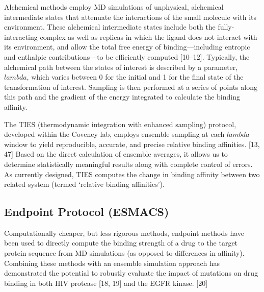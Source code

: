 \documentclass[conference]{IEEEtran}
\begin{document}
Alchemical methods employ MD simulations of unphysical, alchemical intermediate states that attenuate the interactions of the small molecule with its environment. These alchemical intermediate states include both the fully-interacting complex as well as replicas in which the ligand does not interact with its environment, and allow the total free energy of binding—including entropic and enthalpic contributions—to be efficiently computed [10–12]. Typically, the alchemical path between the states of interest is described by a parameter, $lambda$, which varies between 0 for the initial and 1 for the final state of the transformation of interest. Sampling is then performed at a series of points along this path and the gradient of the energy integrated to calculate the binding affinity.

The TIES (thermodynamic integration with enhanced sampling) protocol, developed within the Coveney lab, employs ensemble sampling at each $lambda$ window to yield reproducible, accurate, and precise relative binding affinities. [13, 47] Based on the direct calculation of ensemble averages, it allows us to determine statistically meaningful results along with complete control of errors. As currently designed, TIES computes the change in binding affinity between two related system (termed ‘relative binding affinities’).


\subsection{Endpoint Protocol (ESMACS)}\label{sec:esmacs}

Computationally cheaper, but less rigorous methods, endpoint methods have been used to directly compute the binding strength of a drug to the target protein sequence from MD simulations (as opposed to differences in affinity). Combining these methods with an ensemble simulation approach has demonstrated the potential to robustly evaluate the impact of mutations on drug binding in both HIV protease [18, 19] and the EGFR kinase. [20]     
\end{document}
